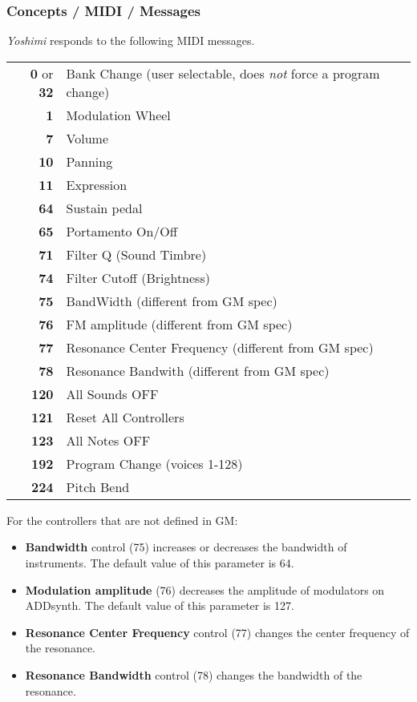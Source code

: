 \subsubsection{Concepts / MIDI / Messages}
\label{subsubsec:concepts_midi_messages}

   \textsl{Yoshimi} responds to the following MIDI messages.

   \begin{tabular}{r l}
      \textbf{0} or \textbf{32} &
         Bank Change (user selectable, does \textsl{not} force a program
         change) \\
      \textbf{1} &
         Modulation Wheel \\
      \textbf{7} &
         Volume \\
      \textbf{10} &
         Panning \\
      \textbf{11} &
         Expression \\
      \textbf{64} &
         Sustain pedal \\
      \textbf{65} &
         Portamento On/Off \\
      \textbf{71} &
         Filter Q (Sound Timbre) \\
      \textbf{74} &
         Filter Cutoff (Brightness) \\
      \textbf{75} &
         BandWidth (different from GM spec) \\
      \textbf{76} &
         FM amplitude (different from GM spec) \\
      \textbf{77} &
         Resonance Center Frequency (different from GM spec) \\
      \textbf{78} &
         Resonance Bandwith (different from GM spec) \\
      \textbf{120} &
         All Sounds OFF \\
      \textbf{121} &
         Reset All Controllers \\
      \textbf{123} &
         All Notes OFF \\
      \textbf{192} &
         Program Change (voices 1-128) \\
      \textbf{224} &
         Pitch Bend \\
   \end{tabular}

   For the controllers that are not defined in GM:

   \begin{itemize}
      \item \textbf{Bandwidth} control (75) increases or decreases the bandwidth
      of instruments. The default value of this parameter is 64. 
      \item \textbf{Modulation amplitude} (76) decreases the amplitude of
      modulators on ADDsynth. The default value of this parameter is 127. 
      \item \textbf{Resonance Center Frequency} control (77) changes the center
      frequency of the resonance. 
      \item \textbf{Resonance Bandwidth} control (78) changes the bandwidth of the
      resonance. 
   \end{itemize}

